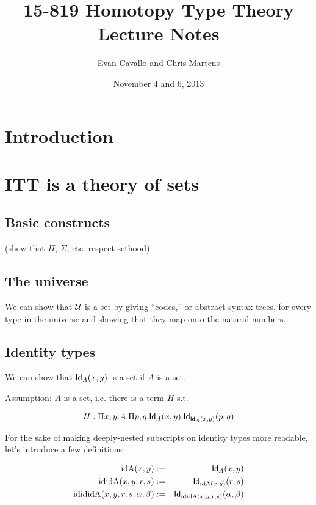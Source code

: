 \documentclass[11pt]{article}
\title{15-819 Homotopy Type Theory\\Lecture Notes}
\author{Evan Cavallo and Chris Martens}
\date{November 4 and 6, 2013}
\begin{document}
\maketitle

\section{Introduction}

% 
% 

\section{ITT is a theory of sets}

\subsection*{Basic constructs}

(show that $\Pi$, $\Sigma$, etc. respect sethood)

\subsection*{The universe}

We can show that $\mathcal{U}$ is a set by giving ``codes,'' or abstract
syntax trees, for every type in the universe and showing that they map onto
the natural numbers. %

\subsection*{Identity types}

We can show that $\mathsf{Id}_{A}(x,y)$ is a set if $A$ is a set.

Assumption: $A$ is a set, i.e. there is a term $H$ s.t.

\[
H : \Pi{x,y}{:}A.\Pi{p,q}{:}\mathsf{Id}_{A}(x,y).\mathsf{Id}_{\mathsf{Id}_{A}(x,y)}(p,q)
\]

For the sake of making deeply-nested subscripts on identity types more
readable, let's introduce a few definitions:

\newcommand{\idA}{\op{idA}}
\newcommand{\ididA}{\op{ididA}}
\newcommand{\idididA}{\op{idididA}}
\begin{eqnarray*}
\op{idA}(x,y) &:=& \Id{A}(x,y)\\
\op{ididA}(x,y,r,s) &:=& \Id{\idA(x,y)}(r,s) \\
\op{idididA}(x,y,r,s,\alpha,\beta) &:=& \Id{\ididA(x,y,r,s)}(\alpha,\beta)
\end{eqnarray*}
\end{document}
